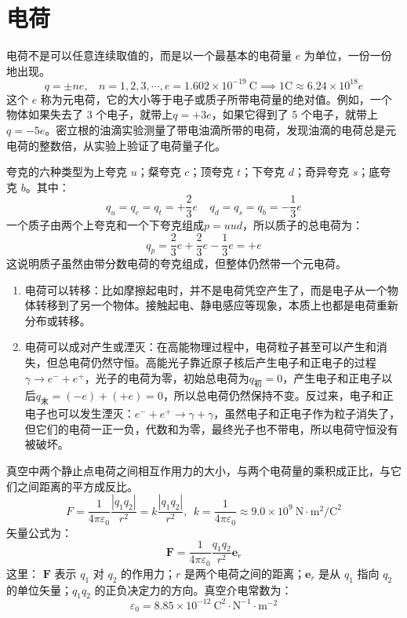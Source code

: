 \documentclass[lang=cn,11pt]{elegantbook}
\begin{document}
\section{电荷}

\begin{definition}[电荷的量子化]
  电荷不是可以任意连续取值的，而是以一个最基本的电荷量 \(e\) 为单位，一份一份地出现。\[q=\pm ne,~~~~ n=1,2,3,\cdots,e=1.602\times10^{-19}\ \mathrm C\implies 1\mathrm C\approx 6.24\times10^{18}e\]这个 \(e\) 称为元电荷，它的大小等于电子或质子所带电荷量的绝对值。例如，一个物体如果失去了 3 个电子，就带上\(q=+3e\)，如果它得到了 5 个电子，就带上\(q=-5e\)。密立根的油滴实验测量了带电油滴所带的电荷，发现油滴的电荷总是元电荷的整数倍，从实验上验证了电荷量子化。
\end{definition}

\begin{definition}[夸克所带电荷量]
  夸克的六种类型为上夸克 \(u\)；粲夸克 \(c\)；顶夸克 \(t\)；下夸克 \(d\)；奇异夸克 \(s\)；底夸克 \(b\)。其中：
\[
q_u=q_c=q_t=+\frac23e~~~~~q_d=q_s=q_b=-\frac13e
\]一个质子由两个上夸克和一个下夸克组成\(p=uud\)，所以质子的总电荷为：
\[
q_p=\frac23e+\frac23e-\frac13e=+e
\]这说明质子虽然由带分数电荷的夸克组成，但整体仍然带一个元电荷。
\end{definition}

\begin{theorem}[电荷守恒定律]
\begin{enumerate}
\item 电荷可以转移：比如摩擦起电时，并不是电荷凭空产生了，而是电子从一个物体转移到了另一个物体。接触起电、静电感应等现象，本质上也都是电荷重新分布或转移。
\item 电荷可以成对产生或湮灭：在高能物理过程中，电荷粒子甚至可以产生和消失，但总电荷仍然守恒。高能光子靠近原子核后产生电子和正电子的过程\(\gamma\rightarrow e^-+e^+\)，光子的电荷为零，初始总电荷为\(q_{\text{初}}=0\)，产生电子和正电子以后\(q_{\text{末}}=(-e)+(+e)=0\)，所以总电荷仍然保持不变。反过来，电子和正电子也可以发生湮灭：\(e^-+e^+\rightarrow \gamma+\gamma\)，虽然电子和正电子作为粒子消失了，但它们的电荷一正一负，代数和为零，最终光子也不带电，所以电荷守恒没有被破坏。
\end{enumerate}
\end{theorem}

\begin{theorem}[库仑定律]
真空中两个静止点电荷之间相互作用力的大小，与两个电荷量的乘积成正比，与它们之间距离的平方成反比。\[F=\frac{1}{4\pi\varepsilon_0}\frac{|q_1q_2|}{r^2}=k\frac{|q_1q_2|}{r^2},~~k=\frac{1}{4\pi\varepsilon_0}\approx9.0\times10^9\ \mathrm{N\cdot m^2/C^2}\]矢量公式为：
\[
\mathbf F=
\frac{1}{4\pi\varepsilon_0}
\frac{q_1q_2}{r^2}\mathbf e_r
\]这里：
\(\mathbf F\) 表示 \(q_1\) 对 \(q_2\) 的作用力；\(r\) 是两个电荷之间的距离；\(\mathbf e_r\) 是从 \(q_1\) 指向 \(q_2\) 的单位矢量；\(q_1q_2\) 的正负决定力的方向。真空介电常数为：
\[
\varepsilon_0=8.85\times10^{-12}
\ \mathrm{C^2\cdot N^{-1}\cdot m^{-2}}
\]
\end{theorem}
\end{document}
